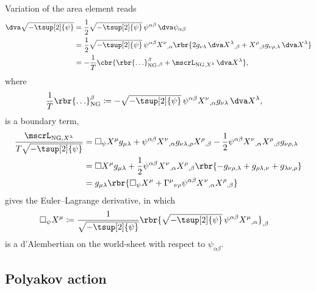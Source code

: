 \documentclass[a4paper,11pt]{article}
\begin{document}
Variation of the area element reads
\begin{align}
\dva \sqrt{-\tsup[2]{\psi}} &=
\frac{1}{2} \sqrt{-\tsup[2]{\psi}}\, \psi^{\alpha\beta}\,
\dva \psi_{\alpha\beta}
\nonumber \\
&=
\frac{1}{2} \sqrt{-\tsup[2]{\psi}}\, \psi^{\alpha\beta}
X^{\nu}{}_{,\alpha}\rbr{2 g_{\nu\lambda}\, \dva X^{\lambda}{}_{,\beta} + 
	X^{\rho}{}_{,\beta} g_{\nu\rho,\lambda}\, \dva X^{\lambda}}
\nonumber \\
&=
-\frac{1}{T} \cbr{ \rbr{\ldots}_\text{NG}^{\beta}{}_{,\beta} +
	\mscrL_{\text{NG}, X^{\lambda}}\,\dva X^\lambda},
\end{align}
where
\begin{align}
\frac{1}{T} \rbr{\ldots}_\text{NG}^{\beta} &\coloneqq 
-\sqrt{-\tsup[2]{\psi}}\, 
\psi^{\alpha\beta} X^{\nu}{}_{,\alpha} g_{\nu\lambda}\,\dva X^{\lambda},
\end{align}
is a boundary term,
\begin{align}
\frac{\mscrL_{\text{NG}, X^{\lambda}}}{T\sqrt{-\tsup[2]{\psi}}} &=
	\square_\psi X^{\mu} g_{\mu\lambda} + 
	\psi^{\alpha\beta} X^{\nu}{}_{,\alpha}
		g_{\nu\lambda,\rho} X^{\rho}{}_{,\beta} -
	\frac{1}{2} \psi^{\alpha\beta} X^{\nu}{}_{,\alpha} X^{\rho}{}_{,\beta}
		g_{\nu\rho,\lambda}
\nonumber \\
&=
\square X^{\mu} g_{\mu\lambda} + 
\frac{1}{2} \psi^{\alpha\beta} X^{\nu}{}_{,\alpha} X^{\rho}{}_{,\beta}
	\rbr{-g_{\nu\rho,\lambda} + g_{\rho\lambda,\nu} + g_{\lambda\nu,\rho}}
\nonumber \\
&=
g_{\mu\lambda} \rbr{\square_\psi X^{\mu} + \Gamma^{\mu}{}_{\nu\rho} 
\psi^{\alpha\beta} X^{\nu}{}_{,\alpha} X^{\rho}{}_{,\beta}}
\end{align}
gives the Euler--Lagrange derivative, in which
\begin{align}
\square_\psi X^{\mu} &\coloneqq
\frac{1}{\sqrt{-\tsup[2]{\psi}}} \rbr{\sqrt{-\tsup[2]{\psi}}\, 
	\psi^{\alpha\beta} X^{\mu}{}_{,\alpha}}_{,\beta}
\end{align}
is a d'Alembertian on the world-sheet with respect to $\psi_{\alpha\beta}$.

\subsection{Polyakov action}
\label{sec:bos-str-pol}
\end{document}
